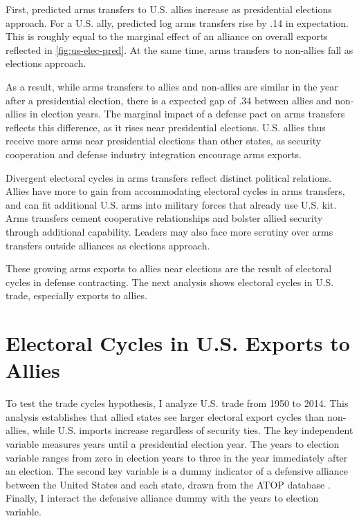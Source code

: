 \documentclass[12pt]{article}
\begin{document}
First, predicted arms transfers to U.S. allies increase as presidential elections approach.
For a U.S. ally, predicted log arms transfers rise by .14 in expectation. 
This is roughly equal to the marginal effect of an alliance on overall exports reflected in \autoref{fig:us-elec-pred}.
At the same time, arms transfers to non-allies fall as elections approach. 


As a result, while arms transfers to allies and non-allies are similar in the year after a presidential election, there is a expected gap of .34 between allies and non-allies in election years.
The marginal impact of a defense pact on arms transfers reflects this difference, as it rises near presidential elections.
U.S. allies thus receive more arms near presidential elections than other states, as security cooperation and defense industry integration encourage arms exports.


Divergent electoral cycles in arms transfers reflect distinct political relations.
Allies have more to gain from accommodating electoral cycles in arms transfers, and can fit additional U.S. arms into military forces that already use U.S. kit.
Arms transfers cement cooperative relationships and bolster allied security through additional capability.
Leaders may also face more scrutiny over arms transfers outside alliances as elections approach. 


These growing arms exports to allies near elections are the result of electoral cycles in defense contracting. 
The next analysis shows electoral cycles in U.S. trade, especially exports to allies. 




\section{Electoral Cycles in U.S. Exports to Allies}

To test the trade cycles hypothesis, I analyze U.S. trade from 1950 to 2014. 
This analysis establishes that allied states see larger electoral export cycles than non-allies, while U.S. imports increase regardless of security ties. 
The key independent variable measures years until a presidential election year.
The years to election variable ranges from zero in election years to three in the year immediately after an election. 
The second key variable is a dummy indicator of a defensive alliance between the United States and each state, drawn from the ATOP database \citep{Leedsetal2002}.
Finally, I interact the defensive alliance dummy with the years to election variable.
\end{document}
